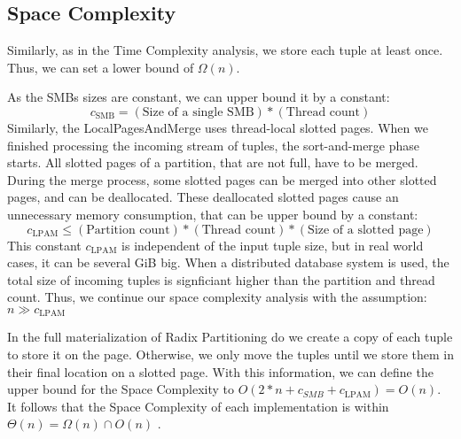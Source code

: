 \subsection{Space Complexity}\label{section-space-complexity}
Similarly, as in the Time Complexity analysis, we store each tuple at least once.
Thus, we can set a lower bound of $\Omega(n)$.

As the \acfp{SMB} sizes are constant, we can upper bound it by a constant:
\begin{equation}
  c_\textrm{SMB} = (\textrm{Size of a single SMB}) * (\textrm{Thread count})
\end{equation}
Similarly, the LocalPagesAndMerge uses thread-local slotted pages.
When we finished processing the incoming stream of tuples, the sort-and-merge phase starts.
All slotted pages of a partition, that are not full, have to be merged.
During the merge process, some slotted pages can be merged into other slotted pages, and can be deallocated.
These deallocated slotted pages cause an unnecessary memory consumption, that can be upper bound by a constant:
\begin{equation}
  c_\textrm{LPAM} \leq (\textrm{Partition count}) * (\textrm{Thread count}) * (\textrm{Size of a slotted page})
\end{equation}
This constant $c_\textrm{LPAM}$ is independent of the input tuple size, but in real world cases, it can be several GiB big.
When a distributed database system is used, the total size of incoming tuples is signficiant higher than the partition and thread count.
Thus, we continue our space complexity analysis with the assumption: $n \gg c_\textrm{LPAM} $

In the full materialization of Radix Partitioning do we create a copy of each tuple to store it on the page.
Otherwise, we only move the tuples until we store them in their final location on a slotted page.
With this information, we can define the upper bound for the Space Complexity to $O(2 * n + c_{SMB} + c_\textrm{LPAM}) = O(n)$.
It follows that the Space Complexity of each implementation is within $\Theta(n) = \Omega(n) \cap O(n) $ .
